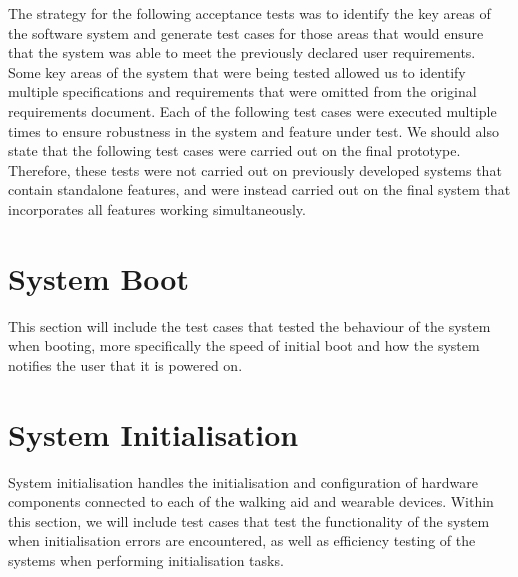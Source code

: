     The strategy for the following acceptance tests was to identify the key areas of the software system and generate test cases for those areas that would ensure that the system was able to meet the previously declared user requirements. Some key areas of the system that were being tested allowed us to identify multiple specifications and requirements that were omitted from the original requirements document. Each of the following test cases were executed multiple times to ensure robustness in the system and feature under test. We should also state that the following test cases were carried out on the final prototype. Therefore, these tests were not carried out on previously developed systems that contain standalone features, and were instead carried out on the final system that incorporates all features working simultaneously.

    \section{System Boot}
    \label{sec:test_boot}

        This section will include the test cases that tested the behaviour of the system when booting, more specifically the speed of initial boot and how the system notifies the user that it is powered on.

        \vspace{1em}
        

        \vspace{4em}
        

        \vspace{4em}
        

        \vspace{4em}
        

    \section{System Initialisation}
    \label{sec:test_init}

        System initialisation handles the initialisation and configuration of hardware components connected to each of the walking aid and wearable devices. Within this section, we will include test cases that test the functionality of the system when initialisation errors are encountered, as well as efficiency testing of the systems when performing initialisation tasks.

